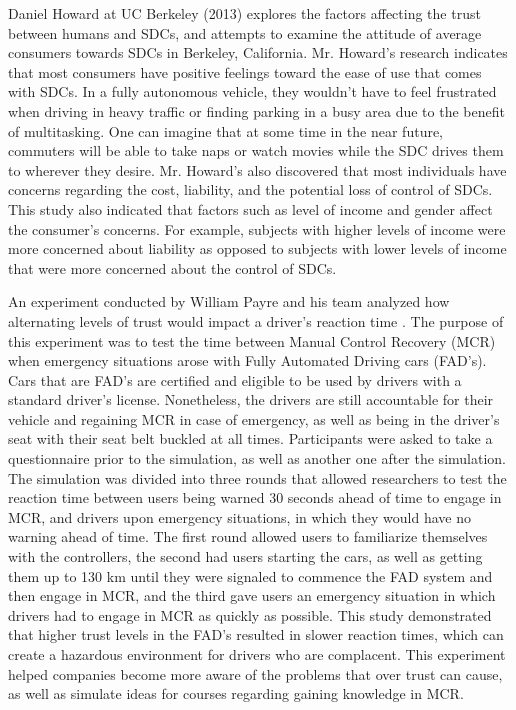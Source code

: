 \documentclass[runningheads,a4paper]{llncs}
\begin{document}
Daniel Howard at UC Berkeley (2013) \cite{howard2014public} explores the factors affecting the trust between humans and SDCs, and attempts to examine the attitude of average consumers towards SDCs in Berkeley, California. Mr. Howard's research indicates that most consumers have positive feelings toward the ease of use that comes with SDCs. In a fully autonomous vehicle, they wouldn't have to feel frustrated when driving in heavy traffic or finding parking in a busy area due to the benefit of multitasking. One can imagine that at some time in the near future, commuters will be able to take naps or watch movies while the SDC drives them to wherever they desire. Mr. Howard's also discovered that most individuals have concerns regarding the cost, liability, and the potential loss of control of SDCs. This study also indicated that factors such as level of income and gender affect the consumer's concerns. For example, subjects with higher levels of income were more concerned about liability as opposed to subjects with lower levels of income that were more concerned about the control of SDCs.

An experiment conducted by William Payre and his team analyzed how alternating levels of trust would impact a driver's reaction time \cite{payre2016fully}.  The purpose of this experiment was to test the time between Manual Control Recovery (MCR) when emergency situations arose with Fully Automated Driving cars (FAD's).  Cars that are FAD's are certified and eligible to be used by drivers with a standard driver's license.  Nonetheless, the drivers are still accountable for their vehicle and regaining MCR in case of emergency, as well as being in the driver's seat with their seat belt buckled at all times.  Participants were asked to take a questionnaire prior to the simulation, as well as another one after the simulation.  The simulation was divided into three rounds that allowed researchers to test the reaction time between users being warned 30 seconds ahead of time to engage in MCR, and drivers upon emergency situations, in which they would have no warning ahead of time.  The first round allowed users to familiarize themselves with the controllers, the second had users starting the cars, as well as getting them up to 130 km until they were signaled to commence the FAD system and then engage in MCR, and the third gave users an emergency situation in which drivers had to engage in MCR as quickly as possible.  This study demonstrated that higher trust levels in the FAD's resulted in slower reaction times, which can create a hazardous environment for drivers who are complacent.  This experiment helped companies become more aware of the problems that over trust can cause, as well as simulate ideas for courses regarding gaining knowledge in MCR.
\end{document}
